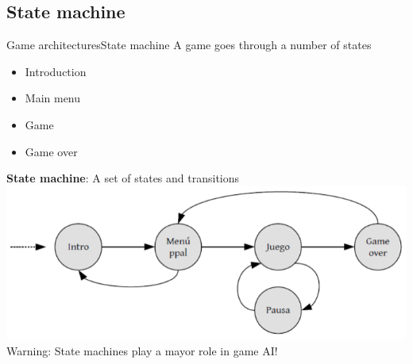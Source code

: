 \documentclass[10pt,compress]{beamer} %
\begin{document}
\subsection{State machine}
\begin{frame}{Game architectures}{State machine}
	\vspace{-0.3cm}
	A game goes through a number of \alert{states}
		\begin{itemize}
			\item Introduction
			\item Main menu
			\item Game
			\item Game over
		\end{itemize}
	\textbf{State machine}: A set of states and transitions
	\vspace{0.3cm}
	\includegraphics[width=0.7\linewidth]{figs/states}\\
	\vspace{-0.2cm}
	Warning: State machines play a mayor role in game AI!
\end{frame}
\end{document}
